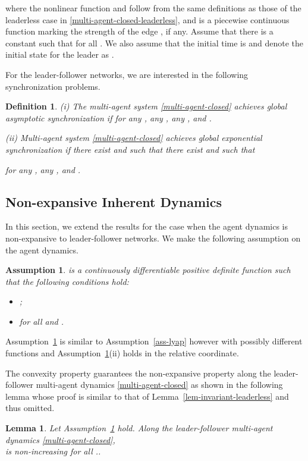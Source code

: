 \documentclass[a4paper, 11pt]{article}
\newtheorem{assumption}{Assumption}
\newtheorem{lemma}{Lemma}
\newtheorem{definition}{Definition}
\begin{document}
where the nonlinear function  and  follow from the same definitions as those of the leaderless case in \eqref{multi-agent-closed-leaderless}, and  is a piecewise continuous function marking  the strength of the edge , if any. Assume that there is a constant  such that  for all . We also 
assume that the initial time is  and denote the initial state for the leader as .

For the leader-follower networks, we are interested in the following synchronization problems.


\begin{definition}\label{lf-syn-asy}
(i) The multi-agent system \eqref{multi-agent-closed} achieves global asymptotic synchronization if
 for any , any , any , and .

(ii) Multi-agent system \eqref{multi-agent-closed} achieves global exponential synchronization if there exist  and  such that
there exist  and  such that

for any , any , and .
\end{definition}

\subsection{Non-expansive Inherent Dynamics}
In this section, we extend the results for the case when the agent dynamics is non-expansive to leader-follower networks. We make the following assumption on the agent dynamics.
\begin{assumption}\label{ass-lyap-lf}
 is a continuously differentiable positive definite function
such that the following conditions hold:
\begin{itemize}
\item[(i).] ;
\item[(ii).]  for all  and .
\end{itemize}
\end{assumption}
Assumption~\ref{ass-lyap-lf} is similar to Assumption~\ref{ass-lyap} however with possibly different functions   and Assumption~\ref{ass-lyap-lf}(ii) holds in the relative coordinate.

The convexity property guarantees the non-expansive property along the leader-follower multi-agent dynamics \eqref{multi-agent-closed} as shown in the following lemma whose proof is similar to that of Lemma~\ref{lem-invariant-leaderless} and thus omitted.
\begin{lemma}\label{lem-invariant}
Let Assumption~\ref{ass-lyap-lf} hold. Along the leader-follower multi-agent dynamics \eqref{multi-agent-closed},\\ 
 is non-increasing for all ..
\end{lemma}
\end{document}
